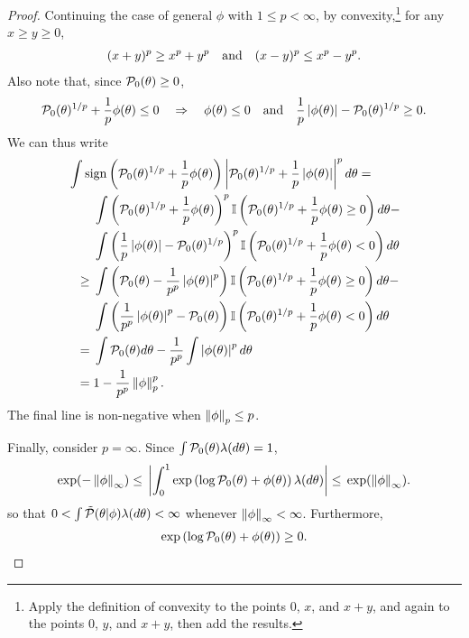 \begin{proof}
Continuing the case of general $\phi$ with $1 \le p < \infty$, by
convexity,\footnote{Apply the definition of convexity to the points $0$, $x$,
and $x + y$, and again to the points $0$, $y$, and $x+y$, then add the results.}
for any $x \ge y \ge 0$,
%
\begin{align*}
%
(x + y)^p \ge{} x^p + y^p \mathand
(x - y)^p \le{} x^p - y^p.
%
\end{align*}
%
Also note that, since $\mathcal{P}_{0}(\theta) \ge 0$,
%
\begin{align*}
%
\pbase(\theta)^{1/p} + \frac{1}{p}\phi(\theta) \le 0
\quad\Rightarrow\quad
\phi(\theta) \le 0 \mathand
\frac{1}{p} \abs{\phi(\theta)} - \pbase(\theta)^{1/p} \ge 0.
%
\end{align*}
%
We can thus write
%
\begin{align*}
%
\MoveEqLeft
\int \mathrm{sign}\left(\pbase(\theta)^{1/p} + \frac{1}{p}\phi(\theta)\right)
    \abs{\pbase(\theta)^{1/p} + \frac{1}{p}\abs{\phi(\theta)}}^{p} d\theta
={}\\&
    \int \left(\pbase(\theta)^{1/p} + \frac{1}{p}\phi(\theta)\right)^{p}
        \ind{\pbase(\theta)^{1/p} + \frac{1}{p}\phi(\theta) \ge 0}
        d\theta - \\&
    \int \left(\frac{1}{p}\abs{\phi(\theta)} - \pbase(\theta)^{1/p}\right)^{p}
        \ind{\pbase(\theta)^{1/p} + \frac{1}{p}\phi(\theta) < 0}
        d\theta
\\\ge{}&
    \int \left(\pbase(\theta) - \frac{1}{p^p}\abs{\phi(\theta)}^{p}\right)
        \ind{\pbase(\theta)^{1/p} + \frac{1}{p}\phi(\theta) \ge 0}
        d\theta - \\&
    \int \left(\frac{1}{p^p}\abs{\phi(\theta)}^p - \pbase(\theta)\right)
        \ind{\pbase(\theta)^{1/p} + \frac{1}{p}\phi(\theta) < 0}
        d\theta
\\={}&
    \int \pbase(\theta) d\theta - \frac{1}{p^p}\int \abs{\phi(\theta)}^p d\theta
\\={}&
    1 - \frac{1}{p^p} \norm{\phi}_p^p.
%
\end{align*}
%
The final line is non-negative when $\left\Vert\phi\right\Vert_p \le p$.





Finally, consider $p = \infty$.  Since $\int \mathcal{P}_{0}(\theta) \lambda(d\theta) = 1$,
%
\begin{align*}
%
\exp(-\norminf{\phi}) \le{}
\abs{\int_0^1 \exp\left(\log \pbase(\theta) + \phi(\theta)\right) \lambda(d\theta)}
\le{}
\exp(\norminf{\phi}).
%
\end{align*}
%
so that $0 < \int \tilde{\mathcal{P}}(\theta \vert \phi) \lambda(d\theta) < \infty$
whenever $\left\Vert\phi\right\Vert_{\infty} < \infty$.  Furthermore,
%
\begin{align*}
%
\exp\left(\log \pbase(\theta) + \phi(\theta)\right) \ge 0.
%
\end{align*}
%
\end{proof}
















